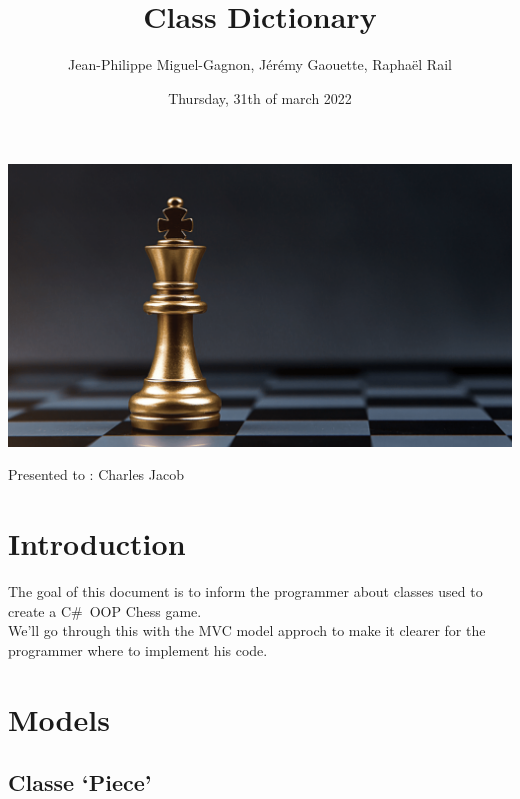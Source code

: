 \documentclass[12pt, letterpaper, twoside]{article}
\title{Class Dictionary}
\author{Jean-Philippe Miguel-Gagnon, Jérémy Gaouette, Raphaël Rail}
\date{Thursday, 31th of march 2022}
\begin{document}
\begin{titlepage}
\maketitle
\includegraphics[width=\textwidth]{CHESS}
\begin{center}Presented to : Charles Jacob\end{center}
\end{titlepage}

\tableofcontents

\newpage

\section{Introduction}

The goal of this document is to inform the programmer about
classes used to create a C\#\ OOP Chess game.
\\

We'll go through this with the MVC model approch to make it
clearer for the programmer where to implement his code. 

\newpage

\section{Models}

\subsection{Classe `Piece'}
\end{document}
